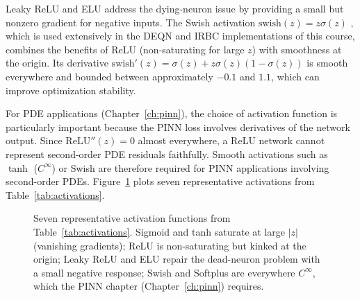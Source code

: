 \documentclass[11pt,a4paper]{report}
\begin{document}
Leaky ReLU and ELU address the dying-neuron issue by providing a small but nonzero gradient for negative inputs.  The Swish activation $\mathrm{swish}(z) = z\sigma(z)$ \citep{ramachandran2017swish}, which is used extensively in the DEQN and IRBC implementations of this course, combines the benefits of ReLU (non-saturating for large $z$) with smoothness at the origin.  Its derivative $\mathrm{swish}'(z) = \sigma(z) + z\sigma(z)(1-\sigma(z))$ is smooth everywhere and bounded between approximately $-0.1$ and $1.1$, which can improve optimization stability.

For PDE applications (Chapter~\ref{ch:pinn}), the choice of activation function is particularly important because the PINN loss involves derivatives of the network output.  Since $\mathrm{ReLU}''(z) = 0$ almost everywhere, a ReLU network cannot represent second-order PDE residuals faithfully.  Smooth activations such as $\tanh$ ($C^\infty$) or Swish are therefore required for PINN applications involving second-order PDEs.  Figure~\ref{fig:activations} plots seven representative activations from Table~\ref{tab:activations}.

\begin{figure}[ht]
\centering
{}
\caption{Seven representative activation functions from Table~\ref{tab:activations}.  Sigmoid and tanh saturate at large $|z|$ (vanishing gradients); ReLU is non-saturating but kinked at the origin; Leaky ReLU and ELU repair the dead-neuron problem with a small negative response; Swish and Softplus are everywhere $C^\infty$, which the PINN chapter (Chapter~\ref{ch:pinn}) requires.}
\label{fig:activations}
\end{figure}
\end{document}
